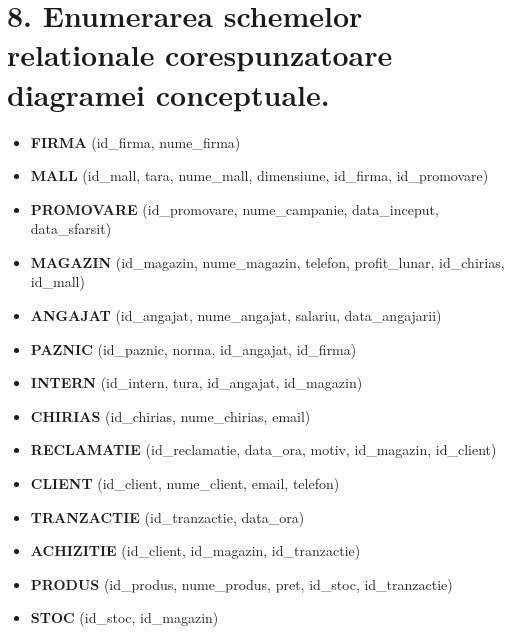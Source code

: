 
\section*{8. Enumerarea schemelor relationale corespunzatoare diagramei conceptuale.}

\vspace{1cm}

\begin{itemize}
    \item \textbf{FIRMA} (id\_firma, nume\_firma)
    \item \textbf{MALL} (id\_mall, tara, nume\_mall, dimensiune, id\_firma, id\_promovare)
    \item \textbf{PROMOVARE} (id\_promovare, nume\_campanie, data\_inceput, data\_sfarsit)
    \item \textbf{MAGAZIN} (id\_magazin, nume\_magazin, telefon, profit\_lunar, id\_chirias, id\_mall)
    \item \textbf{ANGAJAT} (id\_angajat, nume\_angajat, salariu, data\_angajarii)
    \item \textbf{PAZNIC} (id\_paznic, norma, id\_angajat, id\_firma)
    \item \textbf{INTERN} (id\_intern, tura, id\_angajat, id\_magazin)
    \item \textbf{CHIRIAS} (id\_chirias, nume\_chirias, email)
    \item \textbf{RECLAMATIE} (id\_reclamatie, data\_ora, motiv, id\_magazin, id\_client)
    \item \textbf{CLIENT} (id\_client, nume\_client, email, telefon)
    \item \textbf{TRANZACTIE} (id\_tranzactie, data\_ora)
    \item \textbf{ACHIZITIE} (id\_client, id\_magazin, id\_tranzactie)
    \item \textbf{PRODUS} (id\_produs, nume\_produs, pret, id\_stoc, id\_tranzactie)
    \item \textbf{STOC} (id\_stoc, id\_magazin)
\end{itemize}
